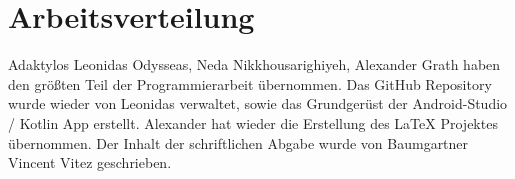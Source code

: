 \section{Arbeitsverteilung}
%
Adaktylos Leonidas Odysseas, Neda Nikkhousarighiyeh, Alexander Grath haben den größten Teil der Programmierarbeit übernommen.
Das GitHub Repository wurde wieder von Leonidas verwaltet, sowie das Grundgerüst der Android-Studio / Kotlin App erstellt.
Alexander hat wieder die Erstellung des LaTeX Projektes übernommen. Der Inhalt der schriftlichen Abgabe wurde von Baumgartner Vincent Vitez geschrieben. 